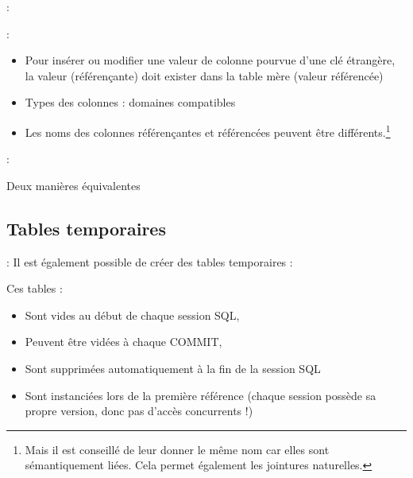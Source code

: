 \documentclass[10pt]{beamer}
\begin{document}
\begin{frame}{\secname : \subsecname}
    
\end{frame}

\begin{frame}{\secname : \subsecname}
    \begin{itemize}
        \item Pour insérer ou modifier une valeur de colonne pourvue d'une clé étrangère, la valeur (référençante) doit exister dans la table mère (valeur référencée)
        \item Types des colonnes : domaines compatibles
        \item Les noms des colonnes référençantes et référencées peuvent être différents.\footnote{Mais il est conseillé de leur donner le même nom car elles sont sémantiquement liées.  Cela permet également les jointures naturelles.}
    \end{itemize}
\end{frame}

\begin{frame}{\secname : \subsecname}
    
    Deux manières équivalentes
    
\end{frame}

\subsection{Tables temporaires}
\begin{frame}{\secname : \subsecname}
    Il est également possible de créer des tables temporaires :
    
    Ces tables :
    \begin{itemize}
        \item Sont vides au début de chaque session SQL,
        \item Peuvent être vidées à chaque COMMIT,
        \item Sont supprimées automatiquement à la fin de la session SQL
        \item Sont instanciées lors de la première référence (chaque session possède sa propre version, donc pas d’accès concurrents !)
    \end{itemize}
\end{frame}
\end{document}
